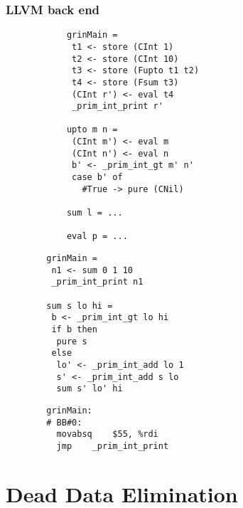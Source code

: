 \documentclass[bigger]{beamer}
\begin{document}
\begin{frame}[fragile]
\frametitle{LLVM back end}

	\hspace{-4cm}
	\begin{minipage}[t]{0.30\textwidth}
		\begin{verbatim}		
			grinMain =
			 t1 <- store (CInt 1)
			 t2 <- store (CInt 10)
			 t3 <- store (Fupto t1 t2)
			 t4 <- store (Fsum t3)
			 (CInt r') <- eval t4
			 _prim_int_print r'
			 
			upto m n =
			 (CInt m') <- eval m
			 (CInt n') <- eval n
			 b' <- _prim_int_gt m' n'
			 case b' of
			   #True -> pure (CNil)
			   
			sum l = ...
			
			eval p = ...
		\end{verbatim}
	\end{minipage}
	\hspace{1.8cm}
	\pause
	\begin{minipage}[t]{0.30\textwidth}
		\begin{verbatim}
		grinMain =
		 n1 <- sum 0 1 10
		 _prim_int_print n1
		
		sum s lo hi =
		 b <- _prim_int_gt lo hi
		 if b then
		  pure s
		 else
		  lo' <- _prim_int_add lo 1
		  s' <- _prim_int_add s lo
		  sum s' lo' hi

		\end{verbatim}
	\end{minipage}
	\hspace{0.5cm}
	\pause
	\begin{minipage}[t]{0.30\textwidth}
		\begin{verbatim}
		grinMain:                      
		# BB#0:                     
		  movabsq    $55, %rdi  
		  jmp    _prim_int_print       
		\end{verbatim}
	\end{minipage}

\end{frame}

\section{Dead Data Elimination}
\end{document}

